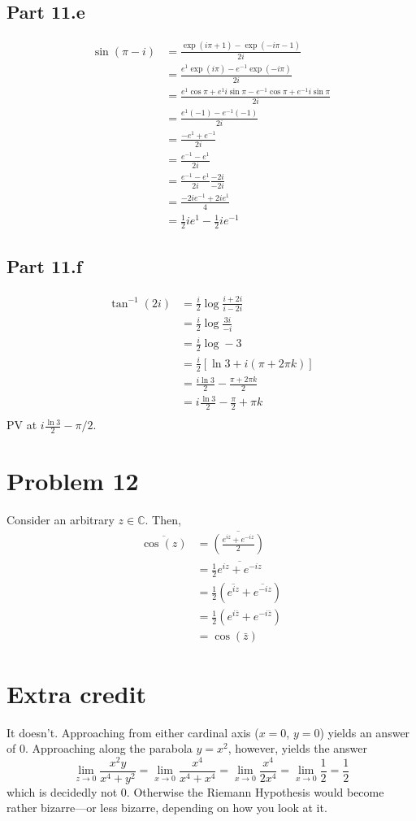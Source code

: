 \documentclass{article}
\theoremstyle{definition}
\newcommand{\Co}{\mathbb{C}}
\newcommand{\p}[1]{\left(#1\right)}
\newcommand{\sq}[1]{\left[#1\right]}
\begin{document}
\subsection{Part 11.e}
\begin{align*}
\sin(\pi-i)
&= \frac{\exp(i \pi + 1) - \exp(-i \pi - 1) }{2i} \\
&= \frac{e^1 \exp(i \pi) - e^{-1} \exp(-i \pi) }{2i} \\
&= \frac{e^1 \cos\pi + e^1 i\sin\pi - e^{-1} \cos \pi + e^{-1} i \sin\pi}{2i} \\
&= \frac{e^1 (-1) - e^{-1} (-1)}{2i} \\
&= \frac{-e^1  + e^{-1}}{2i} \\
&= \frac{e^{-1} - e^1}{2i} \\
&= \frac{e^{-1} - e^1}{2i} \frac{-2i}{-2i} \\
&= \frac{-2i e^{-1} + 2i e^1}{4}\\
&= \frac{1}{2} i e^1 - \frac{1}{2} i e^{-1}
\end{align*}
\subsection{Part 11.f}
\begin{align*}
\tan^{-1}(2i)
&= \frac{i}{2} \log \frac{i+2i}{i-2i}\\
&= \frac{i}{2} \log \frac{3i}{-i} \\
&= \frac{i}{2} \log -3 \\
&= \frac{i}{2} \sq{\ln 3 + i (\pi + 2 \pi k)} \\
&= \frac{i \ln 3}{2} - \frac{\pi + 2 \pi k}{2} \\
&= i\frac{\ln 3}{2} - \frac{\pi}{2} + \pi k \\
\end{align*}
PV at $i \frac{\ln 3}{2} - \pi/2$.

\section{Problem 12}
Consider an arbitrary $z \in \Co$. Then,
\begin{align*}
\overline{\cos(z)}
&= \overline{\p{\frac{e^{iz}+e^{-iz}}{2}}}\\
&= \frac{1}{2} \overline{e^{iz} + e^{-iz}} \\
&= \frac{1}{2} \p{\overline{e^{iz}} + \overline{e^{-iz}} }\\
&= \frac{1}{2} \p{e^{i\bar{z}} + e^{-i\bar{z}} }\\
&= \cos(\bar{z})
\end{align*}

\section{Extra credit}
It doesn't. Approaching from either cardinal axis ($x=0$, $y=0$) 
yields an answer of $0$. Approaching along the parabola $y=x^2$, however,
yields the answer
\[ 
\lim_{z\to 0} \frac{x^2 y}{x^4 + y^2}
= \lim_{x\to 0} \frac{x^4}{x^4+x^4} 
= \lim_{x\to 0} \frac{x^4}{2x^4} 
= \lim_{x\to 0} \frac{1}{2}
= \frac{1}{2}
\]
which is decidedly not $0$. Otherwise the Riemann Hypothesis would become 
rather bizarre---or less bizarre, depending on how you look at it.
\end{document}
